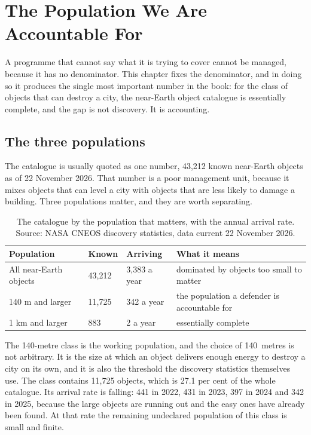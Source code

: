 
\chapter{The Population We Are Accountable For}
\label{ch:population}

A programme that cannot say what it is trying to cover cannot be managed,
because it has no denominator. This chapter fixes the denominator, and in
doing so it produces the single most important number in the book: for the
class of objects that can destroy a city, the near-Earth object catalogue is
essentially complete, and the gap is not discovery. It is accounting.

\section{The three populations}

The catalogue is usually quoted as one number, 43,212 known near-Earth objects
as of 22 November 2026. That number is a poor management unit, because it
mixes objects that can level a city with objects that are less likely to
damage a building. Three populations matter, and they are worth separating.

\begin{table}[!htbp]
\centering
\small
\caption{The catalogue by the population that matters, with the annual arrival
rate. Source: NASA CNEOS discovery statistics, data current 22 November 2026.}
\label{tab:populations}
\begin{tabularx}{\textwidth}{@{}P{1.11in}P{0.73in}P{0.87in}Y@{}}
\toprule
{}
\textbf{Population} & \textbf{Known} & \textbf{Arriving} & \textbf{What it means} \\
\midrule
All near-Earth objects & 43,212 & 3,383 a year & dominated by objects too
small to matter \\
140 m and larger & 11,725 & 342 a year & the population a defender is
accountable for \\
1 km and larger & 883 & 2 a year & essentially complete \\
\bottomrule
\end{tabularx}
\end{table}

The 140-metre class is the working population, and the choice of 140~metres is
not arbitrary. It is the size at which an object delivers enough energy to
destroy a city on its own, and it is also the threshold the discovery
statistics themselves use. The class contains 11,725 objects, which is 27.1 per
cent of the whole catalogue. Its arrival rate is falling: 441 in 2022, 431 in
2023, 397 in 2024 and 342 in 2025, because the large objects are running out
and the easy ones have already been found. At that rate the remaining
undeclared population of this class is small and finite.

